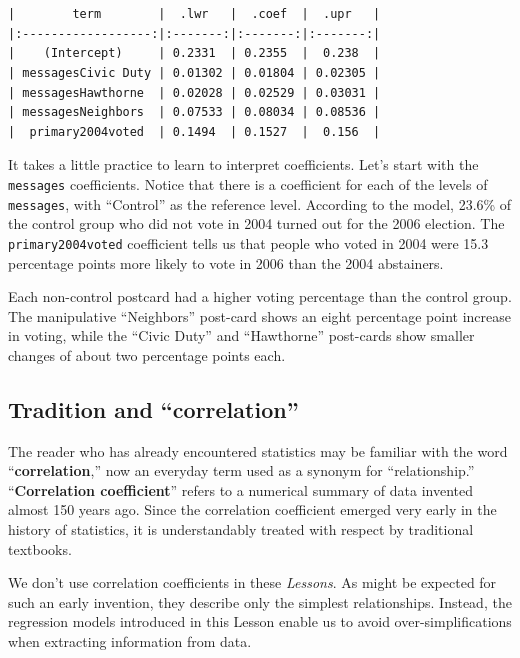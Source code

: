 \documentclass[
  letterpaper,
  DIV=11,
  numbers=noendperiod,
  oneside]{scrartcl}
\begin{document}
\begin{verbatim}


|        term        |  .lwr   |  .coef  |  .upr   |
|:------------------:|:-------:|:-------:|:-------:|
|    (Intercept)     | 0.2331  | 0.2355  |  0.238  |
| messagesCivic Duty | 0.01302 | 0.01804 | 0.02305 |
| messagesHawthorne  | 0.02028 | 0.02529 | 0.03031 |
| messagesNeighbors  | 0.07533 | 0.08034 | 0.08536 |
|  primary2004voted  | 0.1494  | 0.1527  |  0.156  |
\end{verbatim}

It takes a little practice to learn to interpret coefficients. Let's
start with the \texttt{messages} coefficients. Notice that there is a
coefficient for each of the levels of \texttt{messages}, with
``Control'' as the reference level. According to the model, 23.6\% of
the control group who did not vote in 2004 turned out for the 2006
election. The \texttt{primary2004voted} coefficient tells us that people
who voted in 2004 were 15.3 percentage points more likely to vote in
2006 than the 2004 abstainers. {}

Each non-control postcard had a higher voting percentage than the
control group. The manipulative ``Neighbors'' post-card shows an eight
percentage point increase in voting, while the ``Civic Duty'' and
``Hawthorne'' post-cards show smaller changes of about two percentage
points each.

\subsection{Tradition and
``correlation''}\label{tradition-and-correlation}

The reader who has already encountered statistics may be familiar with
the word ``\textbf{correlation},'' now an everyday term used as a
synonym for ``relationship.'' ``\textbf{Correlation coefficient}''
refers to a numerical summary of data invented almost 150 years ago.
Since the correlation coefficient emerged very early in the history of
statistics, it is understandably treated with respect by traditional
textbooks.

We don't use correlation coefficients in these \emph{Lessons}. As might
be expected for such an early invention, they describe only the simplest
relationships. Instead, the regression models introduced in this Lesson
enable us to avoid over-simplifications when extracting information from
data.
\end{document}
